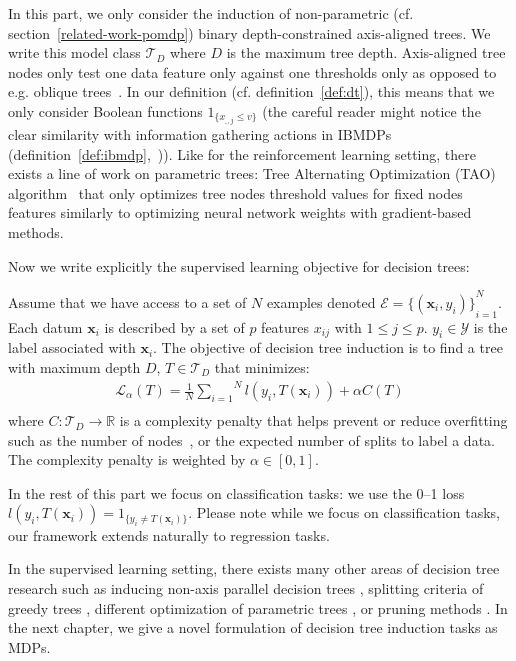 In this part, we only consider the induction of non-parametric (cf. section~\ref{related-work-pomdp}) binary depth-constrained axis-aligned trees. 
We write this model class $\mathcal{T}_D$ where $D$ is the maximum tree depth.
Axis-aligned tree nodes only test one data feature only against one thresholds only as opposed to e.g. oblique trees~\cite{murthy1994system}.
In our definition (cf. definition~\ref{def:dt}), this means that we only consider Boolean functions $1_{\{x_{\_, j} \leq v\}}$ (the careful reader might notice the clear similarity with information gathering actions in IBMDPs (definition~\ref{def:ibmdp},~\cite{topin2021iterative})).
Like for the reinforcement learning setting, there exists a line of work on parametric trees: Tree Alternating Optimization (TAO) algorithm~\cite{NEURIPS2018_185c29dc,9534446,10.1145/3412815.3416882} that only optimizes tree nodes threshold values for fixed nodes features similarly to optimizing neural network weights with gradient-based methods. 

Now we write explicitly the supervised learning objective for decision trees:

\begin{definition}\label{eq:suplearning}
    Assume that we have access to a set of $N$ examples denoted $\mathcal{E} = {\{(\boldsymbol{x}_i, y_i)\}}_{i=1}^N$. Each datum $\boldsymbol{x}_i$ is described by a set of $p$ features $x_{ij}$ with $1\leq j \leq p$. $y_i \in {\mathcal Y}$ is the label associated with $\boldsymbol{x}_i$. The objective of decision tree induction is to find a tree with maximum depth $D$, $T \in \mathcal{T}_D$ that minimizes:
    \begin{align*}
        {\mathcal L}_\alpha(T) = \frac{1}{N}\overset{N}{\underset{i=1}{\sum}}{l}(y_i, T(\boldsymbol{x}_i)) + \alpha C(T) \\
\end{align*}
where $C: \mathcal{T}_D \rightarrow \mathbb{R}$ is a complexity penalty that helps prevent or reduce overfitting such as the number of nodes~\cite{breiman1984classification,quantbnb}, or the expected number of splits to label a data\cite{how-eff}. The complexity penalty is weighted by $\alpha \in [0, 1]$. %
\end{definition}

In the rest of this part we focus on classification tasks: we use the 0--1 loss $l(y_i, T(\boldsymbol{x}_i)) = 1_{\{y_i\neq T(\boldsymbol{x}_i)\}}$.
Please note while we focus on classification tasks, our framework extends naturally to regression tasks.

In the supervised learning setting, there exists many other areas of decision tree research \cite{loh2014fifty} such as inducing non-axis parallel decision trees \cite{murthy1994system,10.1145/3637528.3671903}, splitting criteria of greedy trees \cite{vanderlinden2024optimalgreedydecisiontrees}, different optimization of parametric trees \cite{NIPS2015_1579779b,10.5555/3327757.3327770}, or pruning methods \cite{pruning1,pruning2}.
In the next chapter, we give a novel formulation of decision tree induction tasks as MDPs.